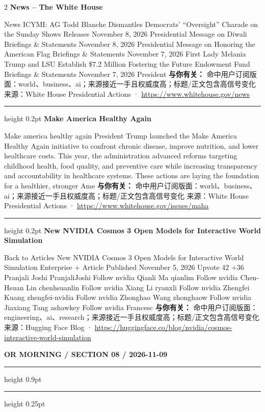 \documentclass[10.5pt]{ctexart}
\begin{document}
\begin{multicols}{2}
{\large\bfseries News – The White House}\par
News ICYMI: AG Todd Blanche Dismantles Democrats’ “Oversight” Charade on the Sunday Shows Releases November 8, 2026 Presidential Message on Diwali Briefings \& Statements November 8, 2026 Presidential Message on Honoring the American Flag Briefings \& Statements November 7, 2026 First Lady Melania Trump and LSU Establish \$7.2 Million Fostering the Future Endowment Fund Briefings \& Statements November 7, 2026 President 
\textbf{与你有关：} 命中用户订阅版面：world、business、ai；来源接近一手且权威度高；标题/正文包含高信号变化
{\footnotesize\color{ormuted} 来源：White House Presidential Actions · \url{https://www.whitehouse.gov/news}}
\vspace{2mm}
\hrule height 0.2pt
\vspace{2mm}
{\large\bfseries Make America Healthy Again}\par
Make america healthy again President Trump launched the Make America Healthy Again initiative to confront chronic disease, improve nutrition, and lower healthcare costs. This year, the administration advanced reforms targeting childhood health, food quality, and preventive care while increasing transparency and accountability in healthcare systems. These actions are laying the foundation for a healthier, stronger Ame
\textbf{与你有关：} 命中用户订阅版面：world、business、ai；来源接近一手且权威度高；标题/正文包含高信号变化
{\footnotesize\color{ormuted} 来源：White House Presidential Actions · \url{https://www.whitehouse.gov/issues/maha}}
\vspace{2mm}
\hrule height 0.2pt
\vspace{2mm}
{\large\bfseries New NVIDIA Cosmos 3 Open Models for Interactive World Simulation}\par
Back to Articles New NVIDIA Cosmos 3 Open Models for Interactive World Simulation Enterprise + Article Published November 5, 2026 Upvote 42 +36 Pranjali Joshi PranjaliJoshi Follow nvidia Qianli Ma qianlim Follow nvidia Chen-Hsuan Lin chenhsuanlin Follow nvidia Xiang Li ryanxli Follow nvidia Zhengfei Kuang zhengfei-nvidia Follow nvidia Zhonghao Wang zhonghaow Follow nvidia Jiaxiang Tang ashawkey Follow nvidia Francesc
\textbf{与你有关：} 命中用户订阅版面：engineering、ai、research；来源接近一手且权威度高；标题/正文包含高信号变化
{\footnotesize\color{ormuted} 来源：Hugging Face Blog · \url{https://huggingface.co/blog/nvidia/cosmos-interactive-world-simulation}}
\end{multicols}
\newpage
{\small\bfseries OR MORNING / SECTION 08 / 2026-11-09}
\vspace{2mm}
\hrule height 0.9pt
\vspace{1.5mm}
\hrule height 0.25pt
\vspace{4mm}
\end{document}
